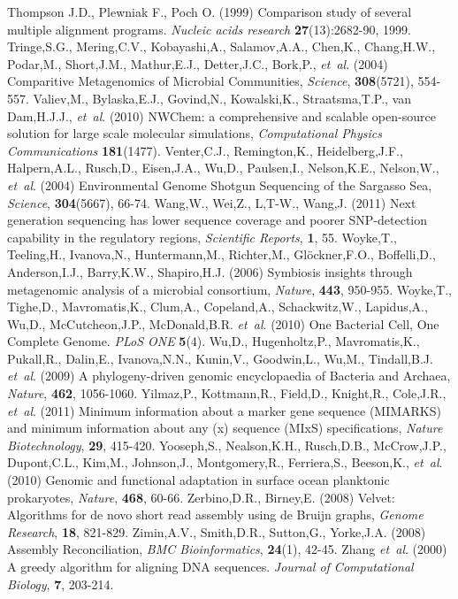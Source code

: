 \documentclass[phd,tocprelim]{cornell}
\begin{document}
\begin{thebibliography}{}
Thompson J.D., Plewniak F., Poch O. (1999) Comparison study of several multiple alignment programs.
\textit{Nucleic acids research} \textbf{27}(13):2682-90, 1999.
 Tringe,S.G., Mering,C.V., Kobayashi,A., Salamov,A.A., Chen,K., Chang,H.W., Podar,M., Short,J.M., Mathur,E.J., Detter,J.C., Bork,P., {\it et~al}. (2004) Comparitive Metagenomics of Microbial Communities, {\it Science}, {\bf 308}(5721), 554-557.
 Valiev,M., Bylaska,E.J., Govind,N., Kowalski,K., Straatsma,T.P., van Dam,H.J.J., {\it et~al}. (2010) NWChem: a comprehensive and scalable open-source solution for large scale molecular simulations, {\it Computational Physics Communications} {\bf 181}(1477).
 Venter,C.J., Remington,K., Heidelberg,J.F., Halpern,A.L., Rusch,D., Eisen,J.A., Wu,D., Paulsen,I., Nelson,K.E., Nelson,W., {\it et~al}. (2004) Environmental Genome Shotgun Sequencing of the Sargasso Sea, {\it Science}, {\bf 304}(5667), 66-74.
 Wang,W., Wei,Z., L,T-W., Wang,J. (2011) Next generation sequencing has lower sequence coverage and poorer SNP-detection capability in the regulatory regions, {\it Scientific Reports}, {\bf 1}, 55.
 Woyke,T., Teeling,H., Ivanova,N., Huntermann,M., Richter,M., Glöckner,F.O., Boffelli,D., Anderson,I.J., Barry,K.W., Shapiro,H.J. (2006) Symbiosis insights through metagenomic analysis of a microbial consortium, {\it Nature}, {\bf 443}, 950-955.    
 Woyke,T., Tighe,D., Mavromatis,K., Clum,A., Copeland,A., Schackwitz,W., Lapidus,A., Wu,D., McCutcheon,J.P., McDonald,B.R. {\it et~al}. (2010) One Bacterial Cell, One Complete Genome. {\it PLoS ONE} {\bf 5}(4).
  Wu,D., Hugenholtz,P., Mavromatis,K., Pukall,R., Dalin,E., Ivanova,N.N., Kunin,V., Goodwin,L., Wu,M., Tindall,B.J. {\it et~al}. (2009) A phylogeny-driven genomic encyclopaedia of Bacteria and Archaea, {\it Nature}, {\bf 462}, 1056-1060.
 Yilmaz,P., Kottmann,R., Field,D., Knight,R., Cole,J.R., {\it et~al}. (2011) Minimum information about a marker gene sequence (MIMARKS) and minimum information about any (x) sequence (MIxS) specifications, {\it Nature Biotechnology}, {\bf 29}, 415-420.
 Yooseph,S., Nealson,K.H., Rusch,D.B., McCrow,J.P., Dupont,C.L., Kim,M., Johnson,J., Montgomery,R., Ferriera,S., Beeson,K., {\it et~al}. (2010) Genomic and functional adaptation in surface ocean planktonic prokaryotes, {\it Nature}, {\bf 468}, 60-66.
 Zerbino,D.R., Birney,E. (2008) Velvet: Algorithms for de novo short read assembly using de Bruijn graphs, {\it Genome Research}, {\bf 18}, 821-829.
 Zimin,A.V., Smith,D.R., Sutton,G., Yorke,J.A. (2008) Assembly Reconciliation, {\it BMC Bioinformatics}, {\bf 24}(1), 42-45.
Zhang \textit{et~al}. (2000) A greedy algorithm for aligning DNA sequences. \textit{Journal of Computational Biology}, \textbf{7}, 203-214.

\end{thebibliography}
\end{document}
